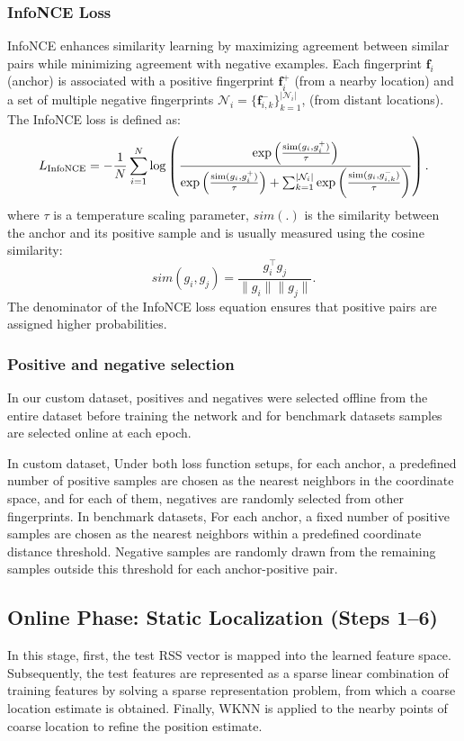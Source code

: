\documentclass[journal,twoside,web]{ieeecolor}
\begin{document}
\subsubsection{InfoNCE Loss}
 InfoNCE enhances similarity learning by maximizing agreement between similar pairs while minimizing agreement with negative examples. Each fingerprint \( \mathbf{f}_i \) (anchor) is associated with a positive fingerprint \( \mathbf{f}_i^+ \) (from a nearby location) and a set of multiple negative fingerprints 
\( \mathcal{N}_i=\{\mathbf{f}_{i,k}^-\}_{k=1}^{ |\mathcal{N}_i|} \), (from distant locations). 
The InfoNCE loss is defined as:
\begin{equation}
\tiny
L_{\text{InfoNCE}} = -\frac{1}{N} \sum_{i=1}^{N} \log \left(
\frac{
\exp\left( \frac{\text{sim}(g_i, g_i^+)}{\tau} \right)
}{
\exp\left( \frac{\text{sim}(g_i, g_i^+)}{\tau} \right)
+  \sum_{k=1}^{|\mathcal{N}_i|} \exp\left( \frac{\text{sim}(g_i, g_{i,k}^-)}{\tau} \right)
}  \right).
\label{eq:infonce-loss}
\end{equation}
where \( \tau \) is a temperature scaling parameter, \( sim(.) \) is the similarity between the anchor and its positive sample and is usually measured using the cosine similarity:
\begin{equation}
 sim(g_i,g_j) = \frac{g_i^\top g_j}{\|g_i\| \|g_j\| }.
\end{equation}
The denominator of the InfoNCE loss equation ensures that positive pairs are assigned higher probabilities.
\subsubsection{Positive and negative selection} 
In our custom dataset, positives and negatives were selected offline from the entire dataset before training the network and for benchmark datasets samples are selected online at each epoch.

In custom dataset, Under both loss function setups, for each anchor, a predefined number of positive samples are chosen as the nearest neighbors in the coordinate space, and for each of them, negatives are randomly selected from other fingerprints.
In benchmark datasets, For each anchor, a fixed number of positive samples are chosen as the nearest neighbors within a predefined coordinate distance threshold. Negative samples are randomly drawn from the remaining samples outside this threshold for each anchor-positive pair.
\subsection{Online Phase: Static Localization (Steps 1–6)}
In this stage, 
first, the test RSS vector is mapped into the learned feature space. Subsequently, the test features are represented as a sparse linear combination of training features by solving a sparse representation problem, from which a coarse location estimate is obtained. Finally, WKNN is applied to the nearby points of coarse location to refine the position estimate.
\end{document}
